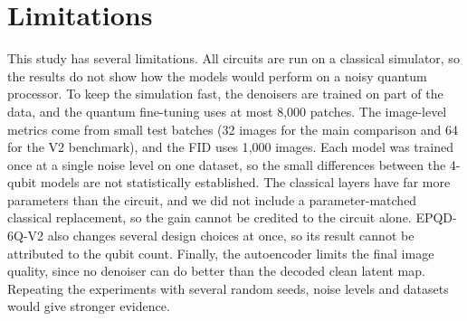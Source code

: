 \section{Limitations}\label{sec:limitations}
This study has several limitations. All circuits are run on a classical simulator, so the results do not show how the models would perform on a noisy quantum processor. To keep the simulation fast, the denoisers are trained on part of the data, and the quantum fine-tuning uses at most 8{,}000 patches. The image-level metrics come from small test batches (32 images for the main comparison and 64 for the V2 benchmark), and the FID uses 1{,}000 images. Each model was trained once at a single noise level on one dataset, so the small differences between the 4-qubit models are not statistically established. The classical layers have far more parameters than the circuit, and we did not include a parameter-matched classical replacement, so the gain cannot be credited to the circuit alone. EPQD-6Q-V2 also changes several design choices at once, so its result cannot be attributed to the qubit count. Finally, the autoencoder limits the final image quality, since no denoiser can do better than the decoded clean latent map. Repeating the experiments with several random seeds, noise levels and datasets would give stronger evidence.
